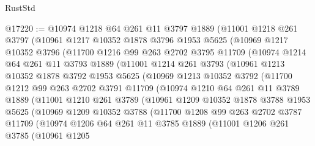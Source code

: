 \begin{lexlean}{RustStd}
\begin{coremodule}
@17220 := @10974
    @1218
    @64
    @261
    @11
    @3797
    @1889
    (@11001
      @1218
      @261
      @3797
      (@10961
        @1217
        @10352
        @1878
        @3796
        @1953
        @5625
        (@10969
          @1217
          @10352
          @3796
          (@11700
            @1216
            @99
            @263
            @2702
            @3795
            @11709
            (@10974
              @1214
              @64
              @261
              @11
              @3793
              @1889
              (@11001
                @1214
                @261
                @3793
                (@10961
                  @1213
                  @10352
                  @1878
                  @3792
                  @1953
                  @5625
                  (@10969
                    @1213
                    @10352
                    @3792
                    (@11700
                      @1212
                      @99
                      @263
                      @2702
                      @3791
                      @11709
                      (@10974
                        @1210
                        @64
                        @261
                        @11
                        @3789
                        @1889
                        (@11001
                          @1210
                          @261
                          @3789
                          (@10961
                            @1209
                            @10352
                            @1878
                            @3788
                            @1953
                            @5625
                            (@10969
                              @1209
                              @10352
                              @3788
                              (@11700
                                @1208
                                @99
                                @263
                                @2702
                                @3787
                                @11709
                                (@10974
                                  @1206
                                  @64
                                  @261
                                  @11
                                  @3785
                                  @1889
                                  (@11001
                                    @1206
                                    @261
                                    @3785
                                    (@10961
                                      @1205

\end{coremodule}
\end{lexlean}
